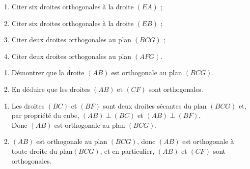 \documentclass{cornouaille}
\begin{document}
\begin{center}
\end{center}

\begin{exercice}
  \begin{enumerate}
  \item Citer six droites orthogonales à la droite $(EA)$ ;
  \item Citer six droites orthogonales à la droite $(EB)$ ;
  \item Citer deux droites orthogonales au plan $(BCG)$ ;
  \item Citer deux droites orthogonales au plan $(AFG)$.
  \end{enumerate}
\end{exercice}

\begin{exercice}
  \begin{enumerate}
  \item Démontrer que la droite $(AB)$ est orthogonale au plan
    $(BCG)$.
  \item En déduire que les droites $(AB)$ et $(CF)$ sont orthogonales.
  \end{enumerate}
\end{exercice}
\begin{solution}
  \begin{enumerate}
\item  Les droites $(BC)$ et $(BF)$ sont deux droites sécantes du plan $(BCG)$ et, par propriété du cube, $(AB)\perp(BC)$ et $(AB)\perp(BF)$.\\
Donc $(AB)$ est orthogonale au plan $(BCG)$.
\item  $(AB)$ est orthogonale au plan $(BCG)$, donc $(AB)$ est orthogonale à toute droite du plan$(BCG)$, et en particulier, $(AB)$ et $(CF)$ sont orthogonales.
\end{enumerate}
\end{solution}
\end{document}
